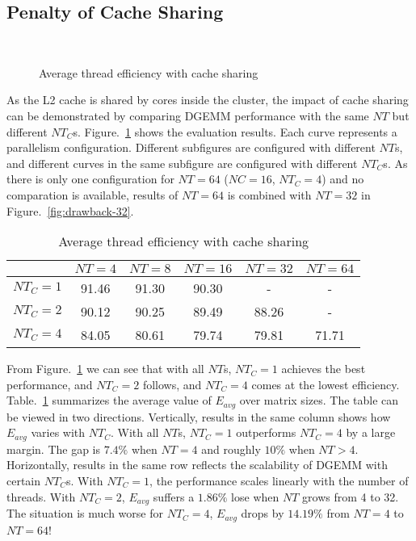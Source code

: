 \subsection{Penalty of Cache Sharing}\label{subsec:drawback}

\begin{figure}
  \centering
  \\
  \caption{Average thread efficiency with cache sharing}
  \label{fig:drawback}
\end{figure}

As the L2 cache is shared by cores inside the cluster,
the impact of cache sharing can be demonstrated
by comparing DGEMM performance with the same $NT$
but different $NT_C$s.
Figure.~\ref{fig:drawback} shows the evaluation results.
Each curve represents a parallelism configuration.
Different subfigures are configured with different $NT$s,
and different curves in the same subfigure are
configured with different $NT_C$s.
As there is only one configuration for $NT=64$ ($NC=16$, $NT_C=4$)
and no comparation is available,
results of $NT=64$ is combined with $NT=32$ in Figure.~\ref{fig:drawback-32}.

\begin{table}
  \centering
  \caption{Average thread efficiency with cache sharing}
  \label{tab:drawback}
  \begin{tabular}{cccccc}
    \toprule
     & $NT\!\!=\!\!4$ & $NT\!\!=\!\!8$ & $NT\!\!=\!\!16$ & $NT\!\!=\!\!32$ & $NT\!\!=\!\!64$ \\
    \midrule
    $NT_C\!\!=\!\!1$ & 91.46 & 91.30 & 90.30 & -     & - \\   
    $NT_C\!\!=\!\!2$ & 90.12 & 90.25 & 89.49 & 88.26 & - \\
    $NT_C\!\!=\!\!4$ & 84.05 & 80.61 & 79.74 & 79.81 & 71.71 \\
    \bottomrule
  \end{tabular}
\end{table}

From Figure.~\ref{fig:drawback} we can see that
with all $NT$s, $NT_C=1$ achieves the best performance,
and $NT_C=2$ follows, and $NT_C=4$ comes at the lowest efficiency.
Table.~\ref{tab:drawback} summarizes the average value
of $E_{avg}$ over matrix sizes.
The table can be viewed in two directions.
Vertically, results in the same column shows how $E_{avg}$ varies with $NT_C$.
With all $NT$s, $NT_C=1$ outperforms $NT_C=4$ by a large margin.
The gap is $7.4\%$ when $NT=4$ and roughly $10\%$ when $NT>4$.
Horizontally, results in the same row reflects the scalability of
DGEMM with certain $NT_C$s.
With $NT_C=1$, the performance scales linearly with the number of threads.
With $NT_C=2$, $E_{avg}$ suffers a $1.86\%$ lose when $NT$ grows from 4 to 32.
The situation is much worse for $NT_C=4$, $E_{avg}$ drops by $14.19\%$ from
$NT=4$ to $NT=64$!

